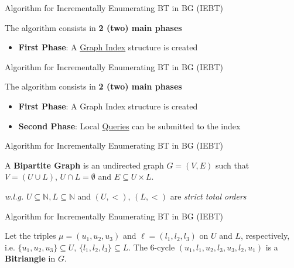 \begin{frame}[fragile]{Algorithm for Incrementally Enumerating BT in BG (IEBT)}
  \begin{center}
  \large The algorithm consists in \textbf{2 (two) main phases} 
  \end{center}  
  \vspace{2em}   
  \begin{itemize}
    \setlength\itemsep{2em}
    \item \textbf{First Phase}: A \underline{\color{red}Graph Index} structure is created
  \end{itemize}
\end{frame}

\begin{frame}[fragile]{Algorithm for Incrementally Enumerating BT in BG (IEBT)}
  \begin{center}
  \large The algorithm consists in \textbf{2 (two) main phases} 
  \end{center}     
  \vspace{2em}   
  \begin{itemize}
    \setlength\itemsep{2em}
    \item {\color{light}\textbf{First Phase}: A Graph Index structure is created}
    \item \textbf{Second Phase}: Local \underline{\color{red}Queries} can be submitted to the index
  \end{itemize}
\end{frame}

\begin{frame}[fragile]{Algorithm for Incrementally Enumerating BT in BG (IEBT)}
  \begin{center}
  \large A \textbf{Bipartite Graph} is an undirected graph $G=(V,E)$  such that $V=(U\cup L)$, $U\cap L=\emptyset$ and $E\subseteq U\times L$.
  \end{center}     
  \begin{center}
    \small \emph{w.l.g.} $U \subseteq \mathbb{N}, L \subseteq \mathbb{N}$ and $(U, <)$, $(L, <)$ are \emph{strict total orders}
  \end{center}            
  \begin{figure}
    \centering
  \end{figure}
\end{frame}

\begin{frame}[fragile]{Algorithm for Incrementally Enumerating BT in BG (IEBT)}
  \begin{center}
  Let the triples $\mu=(u_1, u_2, u_3)$ and $\ell=(l_1, l_2,l_3)$ on $U$ and $L$, respectively, i.e.  $\{u_1, u_2, u_3\} \subseteq U$, $\{l_1, l_2,l_3\} \subseteq L$. 
  The 6-cycle $(u_1,l_1,u_2,l_3,u_3,l_2,u_1)$  is a \textbf{Bitriangle} in $G$. 
  \end{center}      
  \begin{figure}
    \centering
  \end{figure}
\end{frame}

